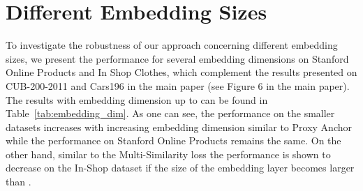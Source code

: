 \documentclass{article}
\begin{document}
\section{Different Embedding Sizes}
\label{sec:embeddings}
\begin{table*}[hbt!]
\centering
{}
\caption{Performance of our approach using different embedding sizes on CUB-200-2011, Cars196, Stanford Online Products and In-Shop Clothes datasets.}
\label{tab:embedding_dim}
\end{table*}


 
To investigate the robustness of our approach concerning different embedding sizes, we present the performance for several embedding dimensions on Stanford Online Products and In Shop Clothes, which complement the results presented on CUB-200-2011 and Cars196 in the main paper (see Figure 6 in the main paper). The results with embedding dimension up to  can be found in Table~\ref{tab:embedding_dim}. 
As one can see, the performance on the smaller datasets increases with increasing embedding dimension similar to Proxy Anchor \cite{DBLP:conf/cvpr/KimKCK20} while the performance on Stanford Online Products remains the same. On the other hand, similar to the Multi-Similarity loss \cite{DDBLP:conf/cvpr/Wand2019} the performance is shown to decrease on the In-Shop dataset if the size of the embedding layer becomes larger than .
\end{document}

